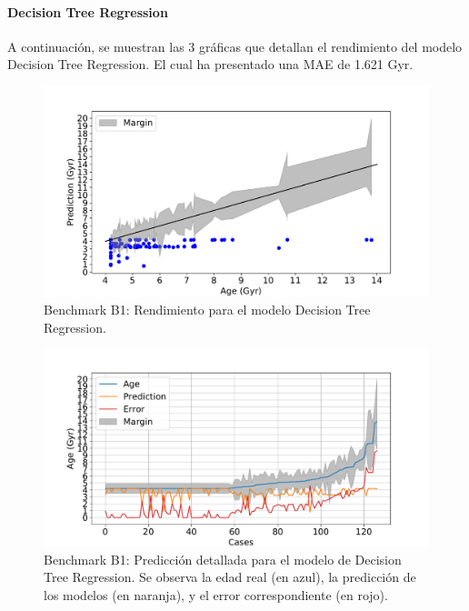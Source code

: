 \paragraph{Decision Tree Regression} 
A continuación, se muestran las 3 gráficas que detallan el rendimiento del modelo Decision Tree Regression. El cual ha presentado una MAE de 1.621 Gyr.

\begin{figure}[H]
\begin{center}
 \includegraphics[width=0.8\linewidth]{Figuras/Experimentos/B_B1_dtr_1.pdf}
\end{center}
\caption{Benchmark B1: Rendimiento para el modelo Decision Tree Regression.}
 \label{fig:benchB1_details_dtr_1}
\end{figure}

\begin{figure}[H]
\begin{center}
 \includegraphics[width=0.8\linewidth]{Figuras/Experimentos/B_B1_dtr_2.pdf}
\end{center}
\caption{Benchmark B1: Predicción detallada para el modelo de Decision Tree Regression. Se observa la edad real (en azul), la predicción de los modelos (en naranja), y el error correspondiente (en rojo).}
 \label{fig:benchB1_details_dtr_2}
\end{figure}

